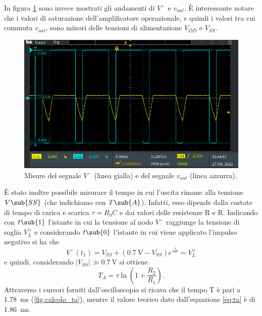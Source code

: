 \noindent
In figura \ref{fig:segnale_uscita} sono invece mostrati gli andamenti di $V^{-}$ e $v_{out}$. È interessante notare che i valori di saturazione dell'amplificatore operazionale, e quindi i valori tra cui commuta $v_{out}$, sono minori delle tensioni di alimentazione $V_{DD}$ e $V_{SS}$.
\begin{figure}[h]
	\centering
	\includegraphics[width=\linewidth]{./ImageFiles/Laboratorio 4/TEK00008.PNG}
	\caption{Misure del segnale $V^{-}$ (linea gialla) e del segnale $v_{out}$ (linea azzurra).}
	\label{fig:segnale_uscita}
\end{figure}

\noindent
\`E stato inoltre possibile misurare il tempo in cui l'uscita rimane alla tensione $V\sub{SS}$ (che indichiamo con $T\sub{A}$). Infatti, esso dipende dalla costate di tempo di carica e scarica $\tau=R_3C$ e dai valori delle resistenze R e R. Indicando con $t\sub{1}$ l'istante in cui la tensione al nodo $V^-$ raggiunge la tensione di soglia $V_L^+$ e considerando $t\sub{0}$ l'istante in cui viene applicato l'impulso negativo si ha che
\begin{equation}
	V^-(t_1)=V_{SS}+(\SI{0.7}{\volt}-V_{SS})e^{\frac{-t_1}{\tau}}=V_L^+
\end{equation}
e quindi, considerando $|V_{SS}|\gg\SI{0.7}{\volt}$ si ottiene
\begin{equation}
	T_A=\tau\ln\left(1+\frac{R_2}{R_1}\right).
	\label{eq:ta}
\end{equation}
Attraverso i cursori forniti dall'oscilloscopio si ricava che il tempo T è pari a \SI{1.78}{\milli\second} (\Fig\ref{fig:calcolo_ta}), mentre il valore teorico dato dall'equazione \ref{eq:ta} è di \SI{1.86}{\milli\second}.

